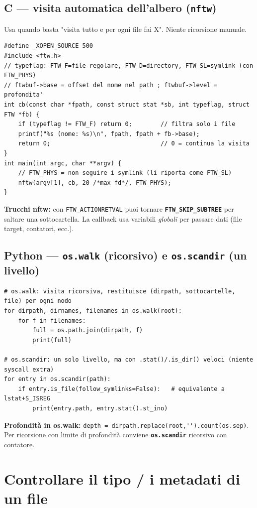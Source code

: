 \documentclass[10pt,a4paper]{article}
\newcommand{\fn}[1]{\texttt{\textbf{#1}}}
\begin{document}
\subsection{C --- visita automatica dell'albero (\fn{nftw})}
Usa quando basta "visita tutto e per ogni file fai X". Niente ricorsione manuale.
\begin{lstlisting}[style=c]
#define _XOPEN_SOURCE 500
#include <ftw.h>
// typeflag: FTW_F=file regolare, FTW_D=directory, FTW_SL=symlink (con FTW_PHYS)
// ftwbuf->base = offset del nome nel path ; ftwbuf->level = profondita'
int cb(const char *fpath, const struct stat *sb, int typeflag, struct FTW *fb) {
    if (typeflag != FTW_F) return 0;        // filtra solo i file
    printf("%s (nome: %s)\n", fpath, fpath + fb->base);
    return 0;                               // 0 = continua la visita
}
int main(int argc, char **argv) {
    // FTW_PHYS = non seguire i symlink (li riporta come FTW_SL)
    nftw(argv[1], cb, 20 /*max fd*/, FTW_PHYS);
}
\end{lstlisting}
\textbf{Trucchi nftw:} con \verb|FTW_ACTIONRETVAL| puoi tornare \fn{FTW\_SKIP\_SUBTREE} per saltare una sottocartella. La callback usa variabili \emph{globali} per passare dati (file target, contatori, ecc.).

\subsection{Python --- \fn{os.walk} (ricorsivo) e \fn{os.scandir} (un livello)}
\begin{lstlisting}[style=py]
# os.walk: visita ricorsiva, restituisce (dirpath, sottocartelle, file) per ogni nodo
for dirpath, dirnames, filenames in os.walk(root):
    for f in filenames:
        full = os.path.join(dirpath, f)
        print(full)

# os.scandir: un solo livello, ma con .stat()/.is_dir() veloci (niente syscall extra)
for entry in os.scandir(path):
    if entry.is_file(follow_symlinks=False):   # equivalente a lstat+S_ISREG
        print(entry.path, entry.stat().st_ino)
\end{lstlisting}
\textbf{Profondità in os.walk:} \verb|depth = dirpath.replace(root,'').count(os.sep)|. Per ricorsione con limite di profondità conviene \fn{os.scandir} ricorsivo con contatore.

\section{Controllare il tipo / i metadati di un file}
\end{document}
